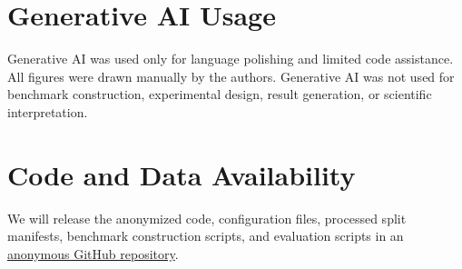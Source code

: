 \documentclass[sigconf,review,balance=false]{acmart}
\begin{document}
\section{Generative AI Usage}
Generative AI was used only for language polishing and limited code
assistance. All figures were drawn manually by the authors. Generative AI was
not used for benchmark construction, experimental design, result generation,
or scientific interpretation.

\section{Code and Data Availability}
\label{sec:code_release}
We will release the anonymized code, configuration files, processed split
manifests, benchmark construction scripts, and evaluation scripts in an
\href{https://anonymous.4open.science/r/NICHETURB-F5E5/}{anonymous GitHub repository}.
\clearpage


\clearpage
\appendix
\setcounter{table}{0}
\setcounter{figure}{0}
\renewcommand{\thetable}{S\arabic{table}}
\renewcommand{\thefigure}{S\arabic{figure}}
\renewcommand{\theHtable}{appendix.table.\arabic{table}}
\renewcommand{\theHfigure}{appendix.figure.\arabic{figure}}

\makeatletter
\def\@currentlabelname{Additional Experiments and Implementation Details}
\makeatother
\label{app:additional_experiments}
\end{document}
